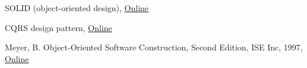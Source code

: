\documentclass[a4paper,12pt,oneside,openright,final]{memoir} %
\begin{document}
\begin{thebibliography}{5}
 SOLID (object-oriented design), 
\href{https://en.wikipedia.org/wiki/SOLID_(object-oriented_design)}{Online}

 CQRS design pattern, 
\href{https://cqrs.files.wordpress.com/2010/11/cqrs_documents.pdf}{Online}

 Meyer, B. Object-Oriented Software Construction, Second Edition, ISE Inc, 1997, \href{https://web.uettaxila.edu.pk/CMS/AUT2011/seSCbs/tutorial/Object%20Oriented%20Software%20Construction.pdf}{Online}

\end{thebibliography}
%
\end{document}
